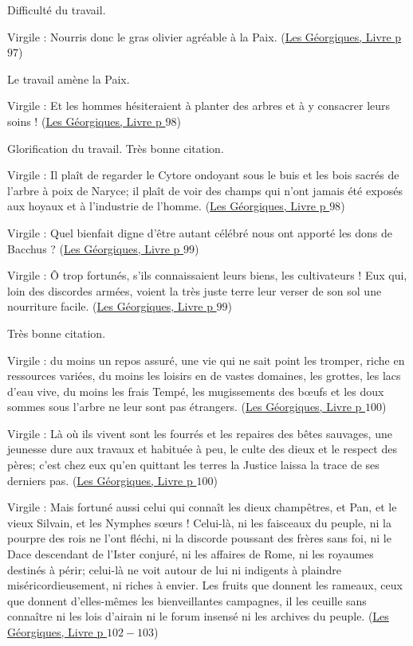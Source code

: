 \documentclass[a4paper, 11pt, hidelinks]{article}
\newcommand{\bs}{\bigskip}
\newcommand{\rb}[1]{\Romanbar{#1}}
\newcommand{\citer}[3]{\bs \begin{center} \textcolor{authorGray}{#1 :} \textcolor{citationRed}{\og #2 \fg} \textcolor{authorGray}{(\underline{#3})} \end{center} \bs}
\begin{document}
Difficulté du travail.


\citer{Virgile}{Nourris donc le gras olivier agréable à la Paix.}{Les Géorgiques, Livre \rb{2} p $97$}


Le travail amène la Paix.


\citer{Virgile}{Et les hommes hésiteraient à planter des arbres et à y consacrer leurs soins !}{Les Géorgiques, Livre \rb{2} p $98$}


Glorification du travail. Très bonne citation.


\citer{Virgile}{Il plaît de regarder le Cytore ondoyant sous le buis et les bois sacrés de l'arbre à poix de Naryce; il plaît
de voir des champs qui n'ont jamais été exposés aux hoyaux et à l'industrie de l'homme.}{Les Géorgiques, Livre \rb{2} p $98$}




\citer{Virgile}{Quel bienfait digne d'être autant célébré nous ont apporté les dons de Bacchus ?}{Les Géorgiques, Livre \rb{2} p $99$}




\citer{Virgile}{Ô trop fortunés, s'ils connaissaient leurs biens, les cultivateurs ! Eux qui, loin des discordes armées, voient la 
très juste terre leur verser de son sol une nourriture facile.}{Les Géorgiques, Livre \rb{2} p $99$}


Très bonne citation. 


\citer{Virgile}{du moins un repos assuré, une vie qui ne sait point les tromper, riche en ressources variées, du moins les loisirs en 
de vastes domaines, les grottes, les lacs d'eau vive, du moins les frais Tempé, les mugissements des b\oe ufs et les doux sommes sous 
l'arbre ne leur sont pas étrangers.}{Les Géorgiques, Livre \rb{2} p $100$}


\citer{Virgile}{Là où ils vivent sont les fourrés et les repaires des bêtes sauvages, une jeunesse dure aux travaux et habituée à peu,
le culte des dieux et le respect des pères; c'est chez eux qu'en quittant les terres la Justice laissa la trace de ses derniers pas.}{Les Géorgiques, Livre \rb{2} p $100$}


\citer{Virgile}{Mais fortuné aussi celui qui connaît les dieux champêtres, et Pan, et le vieux Silvain, et les Nymphes s\oe urs ! 
Celui-là, ni les faisceaux du peuple, ni la pourpre des rois ne l'ont fléchi, ni la discorde poussant des frères sans foi, ni le 
Dace descendant de l'Ister conjuré, ni les affaires de Rome, ni les royaumes destinés à périr; celui-là ne voit autour de lui
ni indigents à plaindre miséricordieusement, ni riches à envier. Les fruits que donnent les rameaux, ceux que donnent d'elles-mêmes
les bienveillantes campagnes, il les ceuille sans connaître ni les lois d'airain ni le forum insensé ni les archives du peuple.}{Les Géorgiques, Livre \rb{2} p $102-103$}
\end{document}
